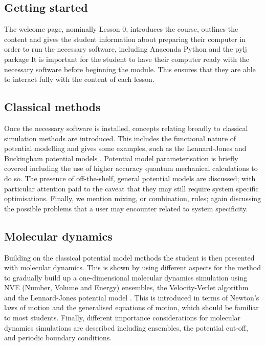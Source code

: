 \documentclass[amsmath,amssymb,twocolumn,superscriptaddress]{revtex4-1}
\begin{document}
\subsection{Getting started}

The welcome page, nominally Lesson 0, introduces the course, outlines the content and gives the student information about preparing their computer in order to run the necessary software, including Anaconda Python and the pylj package \cite{McCluskey2018}
It is important for the student to have their computer ready with the necessary software before beginning the module.
This ensures that they are able to interact fully with the content of each lesson.

\subsection{Classical methods}

Once the necessary software is installed, concepts relating broadly to classical simulation methods are introduced.
This includes the functional nature of potential modelling and gives some examples, such as the Lennard-Jones and Buckingham potential models \cite{LennardJones1924,Buckingham1938}.
Potential model parameterisation is briefly covered including the use of higher accuracy quantum mechanical calculations to do so.
The presence of off-the-shelf, general potential models are discussed; with particular attention paid to the caveat that they may still require system specific optimisations.
Finally, we mention mixing, or combination, rules; again discussing the possible problems that a user may encounter related to system specificity.

\subsection{Molecular dynamics}

Building on the classical potential model methods the student is then presented with molecular dynamics.
This is shown by using different aspects for the method to gradually build up a one-dimensional molecular dynamics simulation using NVE (Number, Volume and Energy) ensembles, the Velocity-Verlet algorithm and the Lennard-Jones potential model \cite{Swope1982,LennardJones1924}.
This is introduced in terms of Newton's laws of motion and the generalised equations of motion, which should be familiar to most students.
Finally, different importance considerations for molecular dynamics simulations are described including ensembles, the potential cut-off, and periodic boundary conditions.
\end{document}
